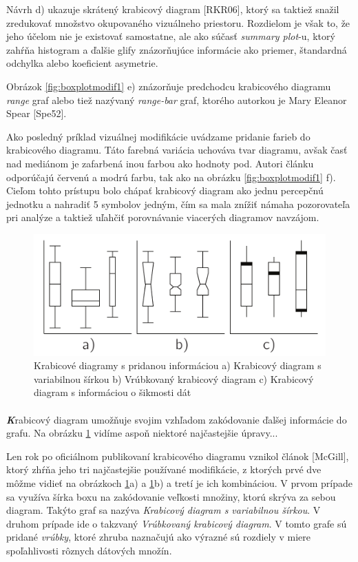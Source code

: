 Návrh d) ukazuje skrátený krabicový diagram [RKR06], ktorý sa taktiež snažil zredukovať množstvo okupovaného vizuálneho priestoru. Rozdielom je však to, že jeho účelom nie je existovať samostatne, ale ako súčasť \textit{summary plot}-u, ktorý zahŕňa histogram a ďalšie glify znázorňujúce informácie ako priemer, štandardná odchylka alebo koeficient asymetrie.

Obrázok \ref{fig:boxplotmodif1} e) znázorňuje predchodcu krabicového diagramu \textit{range} graf alebo tiež nazývaný \textit{range-bar} graf, ktorého autorkou je Mary Eleanor Spear [Spe52].

Ako posledný príklad vizuálnej modifikácie uvádzame pridanie farieb do krabicového diagramu. Táto farebná variácia uchováva tvar diagramu, avšak časť nad mediánom je zafarbená inou farbou ako hodnoty pod. Autori článku odporúčajú červenú a modrú farbu, tak ako na obrázku \ref{fig:boxplotmodif1} f). Cieľom tohto prístupu bolo chápať krabicový diagram ako jednu percepčnú jednotku a nahradiť 5 symbolov jedným, čím sa mala znížiť námaha pozorovateľa pri analýze a taktiež uľahčiť porovnávanie viacerých diagramov navzájom. 


\begin{figure}
	\centering
	\includegraphics[width = 6in]{boxplot3}
	\caption{Krabicové diagramy s pridanou informáciou a) Krabicový diagram s variabilnou šírkou b) Vrúbkovaný krabicový diagram c) Krabicový diagram s informáciou o šikmosti dát}
	\label{fig:boxplotmodif2}
\end{figure}


\paragraph{}
{\large \textbf{\textit{K}}}rabicový diagram umožňuje svojim vzhľadom zakódovanie ďalšej informácie do grafu. Na obrázku \ref{fig:boxplotmodif2} vidíme aspoň niektoré najčastejšie úpravy... 

Len rok po oficiálnom publikovaní krabicového diagramu vznikol článok [McGill], ktorý zhŕňa jeho tri najčastejšie používané modifikácie, z ktorých prvé dve môžme vidieť na obrázkoch \ref{fig:boxplotmodif2}a) a \ref{fig:boxplotmodif2}b) a tretí je ich kombináciou. V prvom prípade sa využíva šírka boxu na zakódovanie veľkosti množiny, ktorú skrýva za sebou diagram. Takýto graf sa nazýva \textit{Krabicový diagram s variabilnou šírkou}.  
V druhom prípade ide o takzvaný \textit{Vrúbkovaný krabicový diagram}. V tomto grafe sú pridané \textit{vrúbky}, ktoré zhruba naznačujú ako výrazné sú rozdiely v miere spoľahlivosti rôznych dátových množín. 

